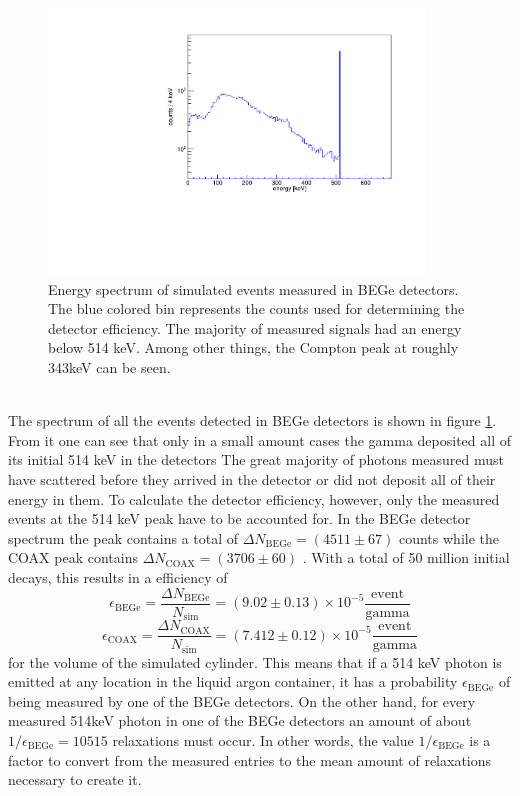 \documentclass[encoding=utf8,british]{tumphthesis}
\begin{document}
\begin{figure}[t!]
	\centering
	\ifmakefigures%
	\includegraphics[width=100mm]{./Bilder/MC-514-Phasenraum.pdf}
	\fi%
	\caption{
    Energy spectrum of simulated events measured in BEGe detectors.
	The blue colored bin represents the counts used for determining the detector efficiency.
	The majority of measured signals had an energy below 514 keV.
	Among other things, the Compton peak at roughly 343keV can be seen.  
	}
	\label{fig:PhasenraumMC514}
\end{figure}

\\
The spectrum of all the events detected in BEGe detectors is shown in figure \ref{fig:PhasenraumMC514}.
From it one can see that only in a small amount cases the gamma deposited all of its initial 514 keV in the detectors
The great majority of photons measured must have scattered before they arrived in the detector or did not deposit all of their energy in them.
To calculate the detector efficiency, however, only the measured events at the 514 keV peak have to be accounted for.
In the BEGe detector spectrum the peak contains a total of \(\Delta N_{\mathrm{BEGe}} = (4511\pm67)\) counts while the COAX peak contains  \(\Delta N_{\mathrm{COAX}} = (3706\pm60)\) .
With a total of 50 million initial decays, this results in a efficiency of 
\begin{equation*}
\epsilon_{\mathrm{BEGe}} = \frac{\Delta N_{\mathrm{BEGe}}}{N_{\mathrm{sim}}} = (9.02\pm0.13) \times 10^{-5}  \frac{\mathrm{event}}{\mathrm{gamma}}
\end{equation*}
\begin{equation*}
\epsilon_{\mathrm{COAX}} = \frac{\Delta N_{\mathrm{COAX}}}{N_{\mathrm{sim}}} = (7.412\pm0.12) \times 10^{-5}  \frac{\mathrm{event}}{\mathrm{gamma}}
\end{equation*}
for the volume of the simulated cylinder.
This means that if a 514 keV photon is emitted at any location in the liquid argon container, it has a probability \(\epsilon_{\mathrm{BEGe}}\) of being measured by one of the BEGe detectors.
On the other hand, for every measured 514keV photon in one of the BEGe detectors an amount of about $1 / \epsilon_{\mathrm{BEGe}} = 10515$  relaxations must occur.
In other words, the value $1 / \epsilon_{\mathrm{BEGe}}$ is a factor to convert from the measured entries to the mean amount of  relaxations necessary to create it.
\\
\end{document}
